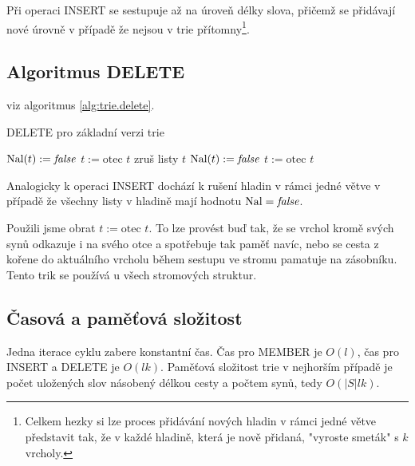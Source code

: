 Při operaci INSERT se sestupuje až na úroveň délky slova, přičemž se
přidávají nové úrovně v případě že nejsou v trie přítomny\footnote{Celkem 
hezky si lze proces přidávání nových hladin v rámci jedné větve představit 
tak, že v každé hladině, která je nově přidaná, "vyroste smeták" s $k$ 
vrcholy.}.

\subsection{Algoritmus DELETE}

viz algoritmus \ref{alg:trie.delete}.

\begin{algorithm}[!htb]
\caption{DELETE pro základní verzi trie}
\label{alg:trie.delete}
\begin{algorithmic}
\STATE {}
        \STATE $\textrm{Nal}(t) := \textit{false}$
        \STATE $t := \text{otec } t$
        \STATE {}
                \STATE zruš listy $t$
                \STATE $\textrm{Nal}(t) := \textit{false}$
                \STATE $t := \text{otec } t$
        \ENDWHILE
\ENDIF  
\end{algorithmic}
\end{algorithm}

Analogicky k operaci INSERT dochází k rušení hladin v rámci jedné větve
v případě že všechny
listy v hladině mají hodnotu $\textrm{Nal} = \textit{false}$.

Použili jsme obrat $t := \text{otec } t$. To lze provést buď tak, že
se vrchol kromě svých synů odkazuje i na svého otce a spotřebuje tak
paměť navíc, nebo se cesta z kořene do aktuálního vrcholu během
sestupu ve stromu pamatuje na zásobníku. Tento trik se používá u 
všech stromových struktur.

\subsection{Časová a paměťová složitost}

Jedna iterace cyklu zabere konstantní čas. Čas pro MEMBER je $O(l)$,
čas pro INSERT a DELETE je $O(l k)$. Paměťová složitost trie v nejhorším
případě je počet
uložených slov násobený délkou cesty a počtem synů, tedy $O(|S| l k)$.

